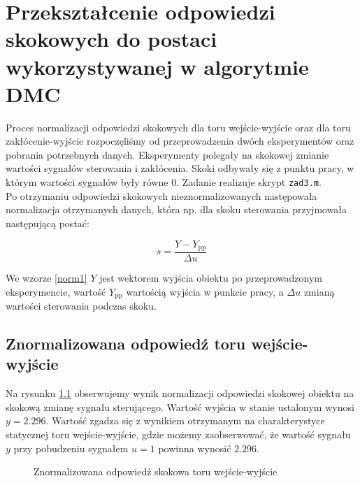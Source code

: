 \chapter{Przekształcenie odpowiedzi skokowych do postaci wykorzystywanej w algorytmie DMC}
\label{zad3}
Proces normalizacji odpowiedzi skokowych dla toru wejście-wyjście oraz dla toru zakłócenie-wyjście rozpoczęliśmy od przeprowadzenia dwóch eksperymentów oraz pobrania potrzebnych danych. Eksperymenty polegały na skokowej zmianie wartości sygnałów sterowania i zakłócenia. Skoki odbywały się z punktu pracy, w którym wartości sygnałów były równe 0. Zadanie realizuje skrypt \verb+zad3.m+.\\
\indent{} Po otrzymaniu odpowiedzi skokowych nieznormalizowanych następowała normalizacja otrzymanych danych, która np. dla skoku sterowania przyjmowała następującą postać:

\begin{equation}
\label{norm1}
s = \frac{Y - Y_{\mathrm{pp}}}{\Delta u}
\end{equation}

We wzorze \ref{norm1} $Y$ jest wektorem wyjścia obiektu po przeprowadzonym eksperymencie, wartość $Y_{\mathrm{pp}}$ wartością wyjścia w punkcie pracy, a $\Delta u$ zmianą wartości sterowania podczas skoku.

\section{Znormalizowana odpowiedź toru wejście-wyjście}
Na rysunku \ref{zad3_norm_odp_u} obserwujemy wynik normalizacji odpowiedzi skokowej obiektu na skokową zmianę sygnału sterującego. Wartość wyjścia w stanie ustalonym wynosi $y = \num{2,296}$. Wartość zgadza się z wynikiem otrzymanym na charakterystyce statycznej toru wejście-wyjście, gdzie możemy zaobserwować, że wartość sygnału $y$ przy pobudzeniu sygnałem $u = 1$ powinna wynosić $\num{2,296}$.   

\begin{figure}[t]
    \centering
    \caption{Znormalizowana odpowiedź skokowa toru wejście-wyjście}
    \label{zad3_norm_odp_u}
\end{figure}


